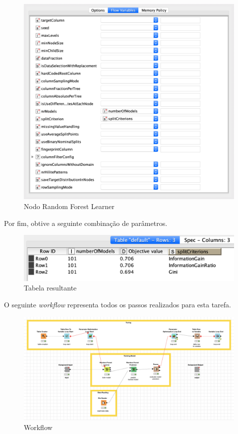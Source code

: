 \begin{figure}[H]
    \centering
    \includegraphics[scale=0.3]{Images/T5_d.png}
    \caption{Nodo Random Forest Learner}
\end{figure}

Por fim, obtive a seguinte combinação de parâmetros.

\begin{figure}[H]
    \centering
    \includegraphics[scale=0.5]{Images/T5_e.png}
    \caption{Tabela resultante}
\end{figure}

O seguinte \textit{workflow} representa todos os passos realizados para esta tarefa.

\begin{figure}[H]
    \centering
    \includegraphics[scale=0.4]{Images/T5_a.png}
    \caption{Workflow}
\end{figure}